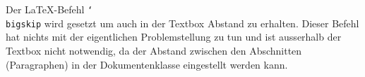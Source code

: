 
Der \LaTeX-Befehl \texttt{\char`\\bigskip} wird gesetzt um auch in der Textbox Abstand zu erhalten. Dieser Befehl hat nichts mit der eigentlichen  Problemstellung zu tun und ist ausserhalb der Textbox nicht notwendig, da der Abstand zwischen den Abschnitten (Paragraphen) in der Dokumentenklasse eingestellt werden kann.
